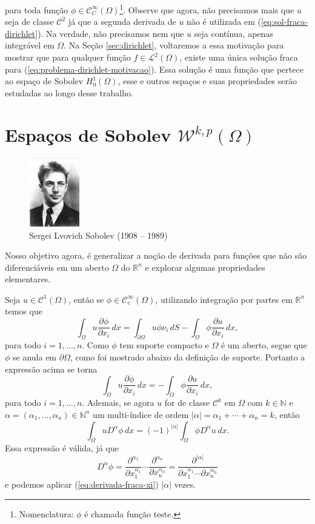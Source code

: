 \documentclass[a4paper, 11pt]{book}
\theoremstyle{definition}
\newcommand{\bN}{\mathbb{N}}
\newcommand{\bR}{\mathbb{R}}
\newcommand{\cC}{\mathcal{C}}
\newcommand{\cL}{\mathcal{L}}
\newcommand{\cW}{\mathcal{W}}
\begin{document}
para toda função $\phi \in \cC^{\infty}_C(\Omega)$\footnote{Nomenclatura: $\phi$ é chamada função teste.}.
Observe que agora, não precisamos mais que $u$ seja de classe $\cC^2$ já que a segunda derivada de $u$ não é utilizada em (\ref{eq:sol-fraca-dirichlet}). Na verdade, não precisamos nem que $u$ seja contínua, apenas integrável em $\Omega$.
Na Seção \ref{sec:dirichlet}, voltaremos a essa motivação para mostrar que para qualquer função $f \in \cL^2(\Omega)$, existe uma única solução fraca para (\ref{eq:problema-dirichlet-motivacao}). 
Essa solução é uma função que pertece ao espaço de Sobolev $H^1_0(\Omega)$, esse e outros espaços e suas propriedades serão estudadas ao longo desse trabalho.


\section{Espaços de Sobolev $\cW^{k,p}(\Omega)$}

\begin{figure}
    \centering
    \includegraphics[height=3cm]{sobolev.jpg}
    \caption{Sergei Lvovich Sobolev (1908 -- 1989)}
\end{figure}

Nosso objetivo agora, é generalizar a noção de derivada para funções que não são diferenciáveis em um aberto $\Omega$ do $\bR^n$ e explorar algumas propriedades elementares.

Seja $u \in \cC^1(\Omega)$, então se $\phi \in \cC^\infty_c(\Omega)$, utilizando integração por partes em $\bR^n$ temos que
\[
    \int_\Omega u \dfrac{\partial \phi}{\partial x_i} \,dx = \int_{\partial\Omega} u\phi \nu_i \, dS- \int_\Omega \phi \dfrac{\partial u}{\partial x_i} \,dx,
\]
para todo $i = 1,\dots,n$. Como $\phi$ tem suporte compacto e $\Omega$ é um aberto, segue que $\phi$ se anula em $\partial\Omega$, como foi mostrado abaixo da definição de suporte. Portanto a expressão acima se torna
\begin{equation} \label{eq:derivada-fraca-xi}
    \int_\Omega u \dfrac{\partial \phi}{\partial x_i} \,dx = - \int_\Omega \phi \dfrac{\partial u}{\partial x_i} \,dx,
\end{equation}
para todo $i = 1,\dots,n$.
Ademais, se agora $u$ for de classe $\cC^k$ em $\Omega$ com $k \in \bN$ e $\alpha = (\alpha_1,\dots,\alpha_n) \in \bN^n$ um multi-índice de ordem $|\alpha| = \alpha_1 + \cdots + \alpha_n = k$, então
\begin{equation} \label{eq:derivada-fraca-dalpha}
    \int_\Omega u D^\alpha \phi \,dx = (-1)^{|\alpha|} \int_\Omega \phi D^\alpha u \,dx.
\end{equation}
Essa expressão é válida, já que
\[
    D^\alpha \phi = \dfrac{\partial^{\alpha_1} }{\partial x_1^{\alpha_1}} \cdots \dfrac{\partial^{\alpha_n} }{\partial x_n^{\alpha_n}} = \dfrac{\partial^{|\alpha|} }{\partial x_1^{\alpha_1} \cdots \partial x_n^{\alpha_n}}
\]
e podemos aplicar (\ref{eq:derivada-fraca-xi}) $|\alpha|$ vezes.
\end{document}
